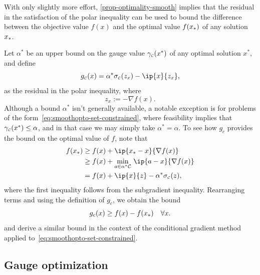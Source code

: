 With only slightly more effort, \autoref{prop-optimality-smooth} implies that the
residual in the satisfaction of the polar inequality can be used to bound the
difference between the objective value $f(x)$ and the optimal value $f(x_*)$
of any solution $x_*$.

Let $\alpha^*$ be an upper bound on the gauge value
$\gamma_{\scriptscriptstyle\mathcal{C}}(x^*)$ of any optimal solution $x^*$, and define
\[
  g\Cs(x) = \alpha^*\sigma\Cs(z_x) - \ip{x}{z_x}, 
\]
as the residual in the polar inequality, where
\[
  z_x := -\nabla f(x).
\]
Although a bound $\alpha^*$ isn't generally available, a notable exception is
for problems of the form~\eqref{eq:smoothopto-set-constrained}, where
feasibility implies that $\gamma_{\scriptscriptstyle\mathcal{C}}(x^*)\le\alpha$, and in that case we may
simply take $\alpha^*=\alpha$. To see how $g_c$ provides the bound on the
optimal value of $f$, note that
\begin{align*}
  f(\xstar) &\ge f(x) + \ip{\xstar-x}{\nabla f(x)}
          \\&\ge f(x) + \min_{a\in\alpha^*\Cscr}\, \ip{a-x}{\nabla f(x)} 
          \\&= f(x) + \ip{x}{z} - \alpha^*\sigma\Cs(z),
\end{align*}
where the first inequality follows from the subgradient inequality.
Rearranging terms and using the definition of $g_c$, we obtain the bound
\[
 g_c(x) \ge f(x)-f(x_*) \quad\forall x. 
\]
\citet{jaggi2013revisiting} and \citet{ndiaye2016gap} derive a similar bound in
the context of the conditional gradient method applied
to~\eqref{eq:smoothopto-set-constrained}. 

\subsection{Gauge optimization}\label{sec:gauge-optimization}

